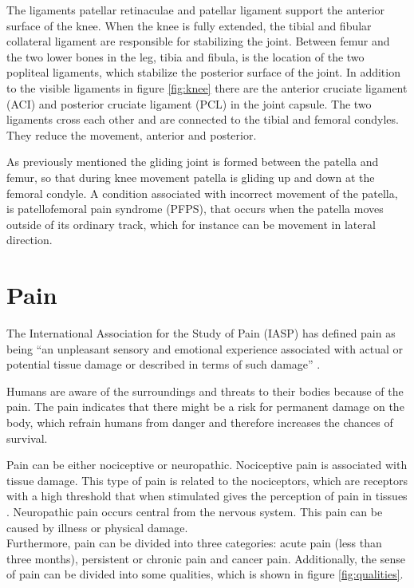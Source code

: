 \noindent
The ligaments patellar retinaculae and patellar ligament support the anterior surface of the knee. When the knee is fully extended, the tibial and fibular collateral ligament are responsible for stabilizing the joint. Between femur and the two lower bones in the leg, tibia and fibula, is the location of the two popliteal ligaments, which stabilize the posterior surface of the joint. In addition to the visible ligaments in figure \ref{fig:knee} there are the anterior cruciate ligament (ACI) and posterior cruciate ligament (PCL) in the joint capsule. The two ligaments cross each other and are connected to the tibial and femoral condyles. They reduce the movement, anterior and posterior.\citep{Martini2012}

As previously mentioned the gliding joint is formed between the patella and femur, so that during knee movement patella is gliding up and down at the femoral condyle. A condition associated with incorrect movement of the patella, is patellofemoral pain syndrome (PFPS), that occurs when the patella moves outside of its ordinary track, which for instance can be movement in lateral direction.\citep{Martini2012}


\section{Pain}

The International Association for the Study of Pain (IASP) has defined pain as being “an unpleasant sensory and emotional experience associated with actual or potential tissue damage or described in terms of such damage” \citep{IASP2012, Schmidt1989}.

\noindent
Humans are aware of the surroundings and threats to their bodies because of the pain. The pain indicates that there might be a risk for permanent damage on the body, which refrain humans from danger and therefore increases the chances of survival. 


\noindent
Pain can be either nociceptive or neuropathic. Nociceptive pain is associated with tissue damage. This type of pain is related to the nociceptors, which are receptors with a high threshold that when stimulated gives the perception of pain in tissues \citep{Schmidt2013}. Neuropathic pain occurs central from the nervous system. This pain can be caused by illness or physical damage. \\


\noindent
Furthermore, pain can be divided into three categories: acute pain (less than three months), persistent or chronic pain and cancer pain.\citep{Briggs2010} Additionally, the sense of pain can be divided into some qualities, which is shown in figure \ref{fig:qualities}. 

